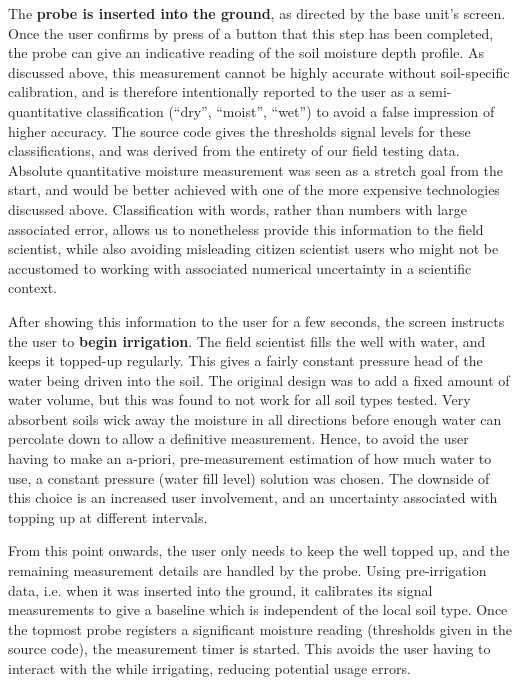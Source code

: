 The \textbf{probe is inserted into the ground}, as directed by the base unit's screen. Once the user confirms by press of a button that this step has been completed, the probe can give an indicative reading of the soil moisture depth profile. As discussed above, this measurement cannot be highly accurate without soil-specific calibration, and is therefore intentionally reported to the user as a semi-quantitative classification (\enquote{dry}, \enquote{moist}, \enquote{wet}) to avoid a false impression of higher accuracy. The source code gives the thresholds signal levels for these classifications, and was derived from the entirety of our field testing data. Absolute quantitative moisture measurement was seen as a stretch goal from the start, and would be better achieved with one of the more expensive technologies discussed above. Classification with words, rather than numbers with large associated error, allows us to nonetheless provide this information to the field scientist, while also avoiding misleading citizen scientist users who might not be accustomed to working with associated numerical uncertainty in a scientific context.

After showing this information to the user for a few seconds, the screen instructs the user to \textbf{begin irrigation}. The field scientist fills the well with water, and keeps it topped-up regularly. This gives a fairly constant pressure head of the water being driven into the soil. The original design was to add a fixed amount of water volume, but this was found to not work for all soil types tested. Very absorbent soils wick away the moisture in all directions before enough water can percolate down to allow a definitive measurement. Hence, to avoid the user having to make an a-priori, pre-measurement estimation of how much water to use, a constant pressure (water fill level) solution was chosen. The downside of this choice is an increased user involvement, and an uncertainty associated with topping up at different intervals.

From this point onwards, the user only needs to keep the well topped up, and the remaining measurement details are handled by the probe. Using pre-irrigation data, i.e. when it was inserted into the ground, it calibrates its signal measurements to give a baseline which is independent of the local soil type. Once the topmost probe registers a significant moisture reading (thresholds given in the source code), the measurement timer is started. This avoids the user having to interact with the  while irrigating, reducing potential usage errors.

